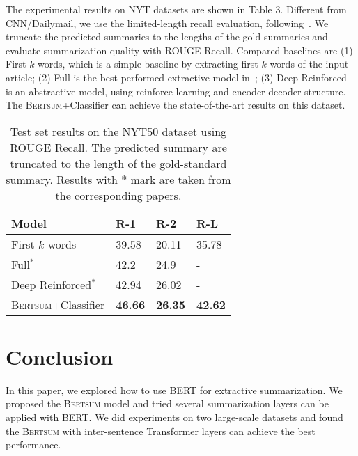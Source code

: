 \documentclass[11pt,a4paper]{article}
\begin{document}
    The experimental results on NYT datasets are shown in Table 3. Different from CNN/Dailymail, we use the limited-length recall evaluation, following~\citet{durrett2016learning}. We truncate the predicted summaries to the lengths of the gold summaries and evaluate summarization quality with ROUGE Recall. 
    Compared baselines are (1) First-$k$ words, which is a simple baseline by extracting first $k$ words of the input article; (2) Full is the best-performed extractive model in~\citet{durrett2016learning}; (3) Deep Reinforced~\cite{paulus2017deep} is an abstractive model, using reinforce learning and encoder-decoder structure. The \textsc{Bertsum}+Classifier  can achieve the state-of-the-art results on this dataset.
    
    

    
    \begin{table}[!htbp]
        \center
        \begin{tabular}{l|lll}
            Model           & R-1    & R-2    & R-L    \\ \hline
            First-$k$ words   &39.58 & 20.11 & 35.78 \\
            Full$^*$            & 42.2  & 24.9  & -     \\
            Deep Reinforced$^*$ & 42.94 &26.02 & -     \\
            \textsc{Bertsum}+Classifier          & \textbf{46.66}    &  \textbf{26.35 } & \textbf{42.62} 
        \end{tabular}
        \caption{Test set results on  the NYT50  dataset using  ROUGE Recall. The predicted summary are truncated to the length of the gold-standard summary. Results with $*$ mark
            are taken from the corresponding papers.}
    \end{table}
    
            \section{Conclusion} 
            In this paper, we explored how to use BERT for extractive summarization.
            We proposed the \textsc{Bertsum} model and tried several summarization layers can be applied with BERT. We did experiments on two large-scale datasets and found the \textsc{Bertsum} with inter-sentence Transformer layers can achieve the best performance.
                        
            

    
    
    

    
\end{document}
